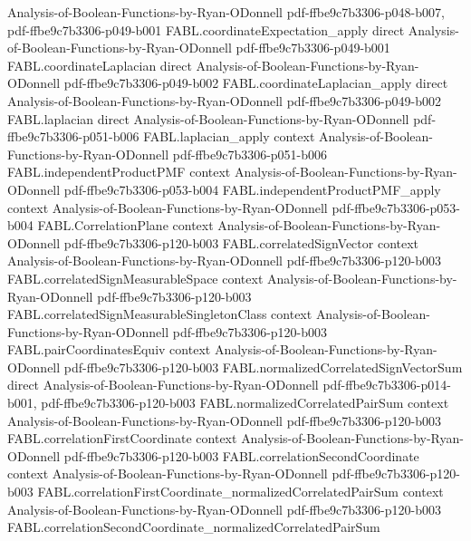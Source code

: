 \begin{theorem}
  {Analysis-of-Boolean-Functions-by-Ryan-ODonnell}
  {pdf-ffbe9c7b3306-p048-b007,
    pdf-ffbe9c7b3306-p049-b001}
\proofstep
  {FABL.coordinateExpectation_apply}
  {direct}
  {Analysis-of-Boolean-Functions-by-Ryan-ODonnell}
  {pdf-ffbe9c7b3306-p049-b001}
\proofstep
  {FABL.coordinateLaplacian}
  {direct}
  {Analysis-of-Boolean-Functions-by-Ryan-ODonnell}
  {pdf-ffbe9c7b3306-p049-b002}
\proofstep
  {FABL.coordinateLaplacian_apply}
  {direct}
  {Analysis-of-Boolean-Functions-by-Ryan-ODonnell}
  {pdf-ffbe9c7b3306-p049-b002}
\proofstep
  {FABL.laplacian}
  {direct}
  {Analysis-of-Boolean-Functions-by-Ryan-ODonnell}
  {pdf-ffbe9c7b3306-p051-b006}
\proofstep
  {FABL.laplacian_apply}
  {context}
  {Analysis-of-Boolean-Functions-by-Ryan-ODonnell}
  {pdf-ffbe9c7b3306-p051-b006}
\proofstep
  {FABL.independentProductPMF}
  {context}
  {Analysis-of-Boolean-Functions-by-Ryan-ODonnell}
  {pdf-ffbe9c7b3306-p053-b004}
\proofstep
  {FABL.independentProductPMF_apply}
  {context}
  {Analysis-of-Boolean-Functions-by-Ryan-ODonnell}
  {pdf-ffbe9c7b3306-p053-b004}
\proofstep
  {FABL.CorrelationPlane}
  {context}
  {Analysis-of-Boolean-Functions-by-Ryan-ODonnell}
  {pdf-ffbe9c7b3306-p120-b003}
\proofstep
  {FABL.correlatedSignVector}
  {context}
  {Analysis-of-Boolean-Functions-by-Ryan-ODonnell}
  {pdf-ffbe9c7b3306-p120-b003}
\proofstep
  {FABL.correlatedSignMeasurableSpace}
  {context}
  {Analysis-of-Boolean-Functions-by-Ryan-ODonnell}
  {pdf-ffbe9c7b3306-p120-b003}
\proofstep
  {FABL.correlatedSignMeasurableSingletonClass}
  {context}
  {Analysis-of-Boolean-Functions-by-Ryan-ODonnell}
  {pdf-ffbe9c7b3306-p120-b003}
\proofstep
  {FABL.pairCoordinatesEquiv}
  {context}
  {Analysis-of-Boolean-Functions-by-Ryan-ODonnell}
  {pdf-ffbe9c7b3306-p120-b003}
\proofstep
  {FABL.normalizedCorrelatedSignVectorSum}
  {direct}
  {Analysis-of-Boolean-Functions-by-Ryan-ODonnell}
  {pdf-ffbe9c7b3306-p014-b001,
    pdf-ffbe9c7b3306-p120-b003}
\proofstep
  {FABL.normalizedCorrelatedPairSum}
  {context}
  {Analysis-of-Boolean-Functions-by-Ryan-ODonnell}
  {pdf-ffbe9c7b3306-p120-b003}
\proofstep
  {FABL.correlationFirstCoordinate}
  {context}
  {Analysis-of-Boolean-Functions-by-Ryan-ODonnell}
  {pdf-ffbe9c7b3306-p120-b003}
\proofstep
  {FABL.correlationSecondCoordinate}
  {context}
  {Analysis-of-Boolean-Functions-by-Ryan-ODonnell}
  {pdf-ffbe9c7b3306-p120-b003}
\proofstep
  {FABL.correlationFirstCoordinate_normalizedCorrelatedPairSum}
  {context}
  {Analysis-of-Boolean-Functions-by-Ryan-ODonnell}
  {pdf-ffbe9c7b3306-p120-b003}
\proofstep
  {FABL.correlationSecondCoordinate_normalizedCorrelatedPairSum}

\end{theorem}
